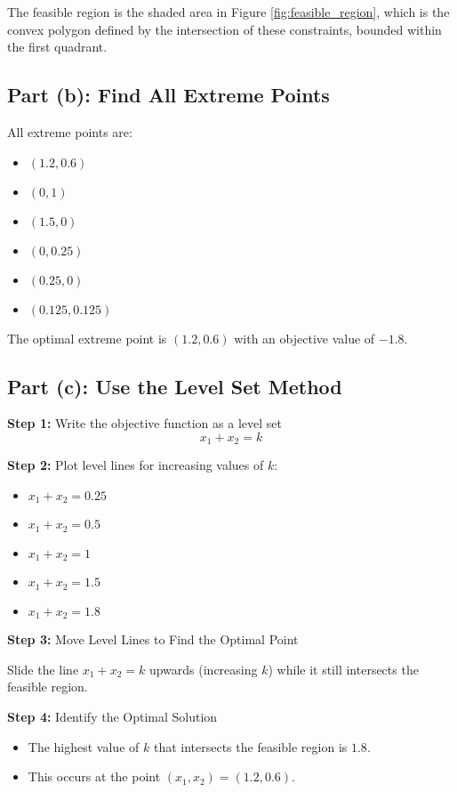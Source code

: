 \documentclass{article}
\begin{document}
The feasible region is the shaded area in Figure \ref{fig:feasible_region}, which is the convex polygon defined by the intersection of these constraints, bounded within the first quadrant.

\subsection*{Part (b): Find All Extreme Points}

All extreme points are:
\begin{itemize}
\item $(1.2, 0.6)$
\item $(0, 1)$
\item $(1.5, 0)$
\item $(0, 0.25)$
\item $(0.25, 0)$
\item $(0.125, 0.125)$
\end{itemize}

The optimal extreme point is $(1.2, 0.6)$ with an objective value of $-1.8$.

\subsection*{Part (c): Use the Level Set Method}

\textbf{Step 1:} Write the objective function as a level set
\[x_1 + x_2 = k\]

\textbf{Step 2:} Plot level lines for increasing values of $k$:
\begin{itemize}
\item $x_1 + x_2 = 0.25$
\item $x_1 + x_2 = 0.5$
\item $x_1 + x_2 = 1$
\item $x_1 + x_2 = 1.5$
\item $x_1 + x_2 = 1.8$
\end{itemize}

\textbf{Step 3:} Move Level Lines to Find the Optimal Point

Slide the line $x_1 + x_2 = k$ upwards (increasing $k$) while it still intersects the feasible region.

\textbf{Step 4:} Identify the Optimal Solution
\begin{itemize}
\item The highest value of $k$ that intersects the feasible region is $1.8$.
\item This occurs at the point $(x_1, x_2) = (1.2, 0.6)$.
\end{itemize}
\end{document}
